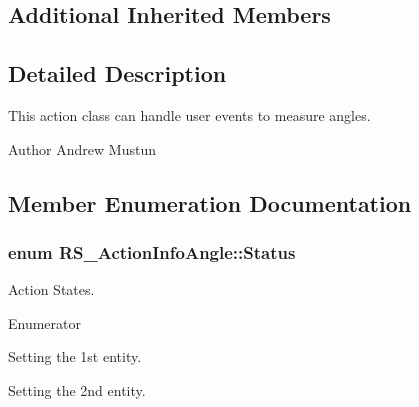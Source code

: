 \subsection*{Additional Inherited Members}


\subsection{Detailed Description}
This action class can handle user events to measure angles.

\begin{DoxyAuthor}{Author}
Andrew Mustun 
\end{DoxyAuthor}


\subsection{Member Enumeration Documentation}
\hypertarget{classRS__ActionInfoAngle_a6679ade78c6497eec42e7ca76b486860}{
\subsubsection[{Status}]{\setlength{\rightskip}{0pt plus 5cm}enum {\bf R\-S\-\_\-\-Action\-Info\-Angle\-::\-Status}}}\label{classRS__ActionInfoAngle_a6679ade78c6497eec42e7ca76b486860}
Action States. \begin{Desc}
\item[Enumerator]\par
\begin{description}
\item[{\em 
\hypertarget{classRS__ActionInfoAngle_a6679ade78c6497eec42e7ca76b486860afea0b0ff6a75624ddc9b22c649716870}{Set\-Entity1}\label{classRS__ActionInfoAngle_a6679ade78c6497eec42e7ca76b486860afea0b0ff6a75624ddc9b22c649716870}
}]Setting the 1st entity. \item[{\em 
\hypertarget{classRS__ActionInfoAngle_a6679ade78c6497eec42e7ca76b486860a93c5b9272b59671ec3570a61b69b769d}{Set\-Entity2}\label{classRS__ActionInfoAngle_a6679ade78c6497eec42e7ca76b486860a93c5b9272b59671ec3570a61b69b769d}
}]Setting the 2nd entity. \end{description}
\end{Desc}


